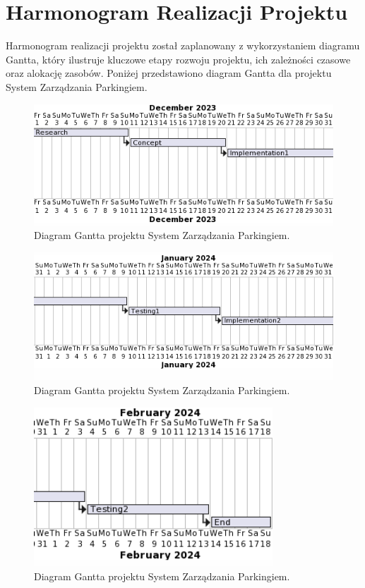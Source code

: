 \chapter{Harmonogram Realizacji Projektu}

Harmonogram realizacji projektu został zaplanowany z wykorzystaniem diagramu Gantta, który ilustruje kluczowe etapy rozwoju projektu, ich zależności czasowe oraz alokację zasobów. Poniżej przedstawiono diagram Gantta dla projektu System Zarządzania Parkingiem.

\begin{figure}[H]
\centering
\includegraphics[width=\textwidth]{photos/gant1.png}
\caption{Diagram Gantta projektu System Zarządzania Parkingiem.}
\end{figure}
\begin{figure}[H]
\centering
\includegraphics[width=\textwidth]{photos/gant2.png}
\caption{Diagram Gantta projektu System Zarządzania Parkingiem.}
\end{figure}
\begin{figure}[H]
\centering
\includegraphics[width=0.80\textwidth]{photos/gant3.png}
\caption{Diagram Gantta projektu System Zarządzania Parkingiem.}
\end{figure}
